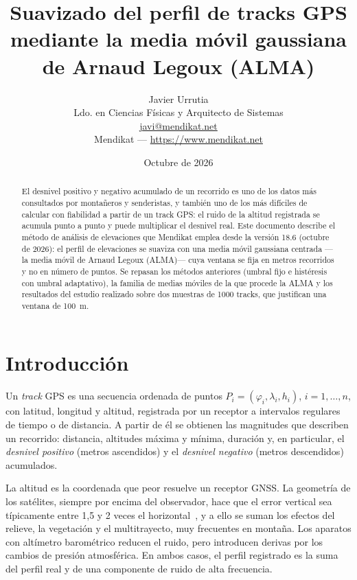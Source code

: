 \documentclass[11pt,a4paper]{article}
\title{%
    \textbf{Suavizado del perfil de tracks GPS mediante la media móvil
    gaussiana de Arnaud Legoux (ALMA)}}
\author{%
    Javier Urrutia\\
    \small Ldo. en Ciencias Físicas y Arquitecto de Sistemas\\
    \small \href{mailto:javi@mendikat.net}{javi@mendikat.net}\\
    \small Mendikat --- \url{https://www.mendikat.net}}
\date{Octubre de 2026}
\begin{document}
\maketitle

\begin{abstract}
El desnivel positivo y negativo acumulado de un recorrido es uno de los datos
más consultados por montañeros y senderistas, y también uno de los más difíciles
de calcular con fiabilidad a partir de un track GPS: el ruido de la altitud
registrada se acumula punto a punto y puede multiplicar el desnivel real.
Este documento describe el método de análisis de elevaciones que Mendikat emplea
desde la versión 18.6 (octubre de 2026): el perfil de elevaciones se suaviza
con una media móvil gaussiana centrada ---la media móvil de Arnaud Legoux
(ALMA)--- cuya ventana se fija en metros recorridos y no en número de puntos.
Se repasan los métodos anteriores (umbral fijo e histéresis con umbral
adaptativo), la familia de medias móviles de la que procede la ALMA y los
resultados del estudio realizado sobre dos muestras de 1000 tracks, que
justifican una ventana de 100~m.
\end{abstract}

\tableofcontents
\clearpage

\section{Introducción}

Un \emph{track} GPS es una secuencia ordenada de puntos
$P_i = (\varphi_i, \lambda_i, h_i)$, $i = 1, \dots, n$, con latitud, longitud y
altitud, registrada por un receptor a intervalos regulares de tiempo o de
distancia. A partir de él se obtienen las magnitudes que describen un
recorrido: distancia, altitudes máxima y mínima, duración y, en particular, el
\emph{desnivel positivo} (metros ascendidos) y el \emph{desnivel negativo}
(metros descendidos) acumulados.

La altitud es la coordenada que peor resuelve un receptor GNSS. La geometría de
los satélites, siempre por encima del observador, hace que el error vertical
sea típicamente entre 1,5 y 2 veces el horizontal~\cite{kaplan}, y a ello se suman los
efectos del relieve, la vegetación y el multitrayecto, muy frecuentes en
montaña. Los aparatos con altímetro barométrico reducen el ruido, pero
introducen derivas por los cambios de presión atmosférica. En ambos casos, el
perfil registrado es la suma del perfil real y de una componente de ruido de
alta frecuencia.
\end{document}
